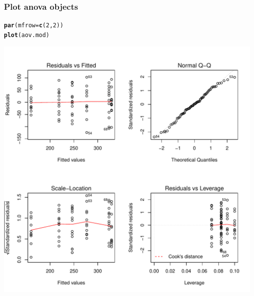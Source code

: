 \documentclass{beamer}\usepackage[]{graphicx}\usepackage[]{color}
\makeatletter
\newcommand{\hlnum}[1]{\textcolor[rgb]{0.686,0.059,0.569}{#1}}%
\newcommand{\hlstd}[1]{\textcolor[rgb]{0.345,0.345,0.345}{#1}}%
\newcommand{\hlkwc}[1]{\textcolor[rgb]{0.333,0.667,0.333}{#1}}%
\newcommand{\hlkwd}[1]{\textcolor[rgb]{0.737,0.353,0.396}{\textbf{#1}}}%
\newenvironment{kframe}{%
 \def\at@end@of@kframe{}%
 \ifinner\ifhmode%
  \def\at@end@of@kframe{\end{minipage}}%
  \begin{minipage}{\columnwidth}%
 \fi\fi%
 \def\FrameCommand##1{\hskip\@totalleftmargin \hskip-\fboxsep
 \colorbox{shadecolor}{##1}\hskip-\fboxsep
     \hskip-\linewidth \hskip-\@totalleftmargin \hskip\columnwidth}%
 \MakeFramed {\advance\hsize-\width
   \@totalleftmargin\z@ \linewidth\hsize
   \@setminipage}}%
 {\par\unskip\endMakeFramed%
 \at@end@of@kframe}
\newenvironment{knitrout}{}{} %
\makeatother
\begin{document}
{{{\begin{frame}[fragile]
\begin{knitrout}
\end{knitrout}
\end{frame}


\begin{frame}[fragile]
\frametitle{Plot anova objects}
\begin{knitrout}\scriptsize
{}\color{fgcolor}\begin{kframe}
\begin{alltt}
\hlkwd{par}\hlstd{(}\hlkwc{mfrow}\hlstd{=}\hlkwd{c}\hlstd{(}\hlnum{2}\hlstd{,} \hlnum{2}\hlstd{))}
\hlkwd{plot}\hlstd{(aov.mod)}
\end{alltt}
\end{kframe}

{\centering \includegraphics[width=0.7\linewidth]{figure/unnamed-chunk-50-1} 

}



\end{knitrout}
\end{frame}


}}}
\end{document}
